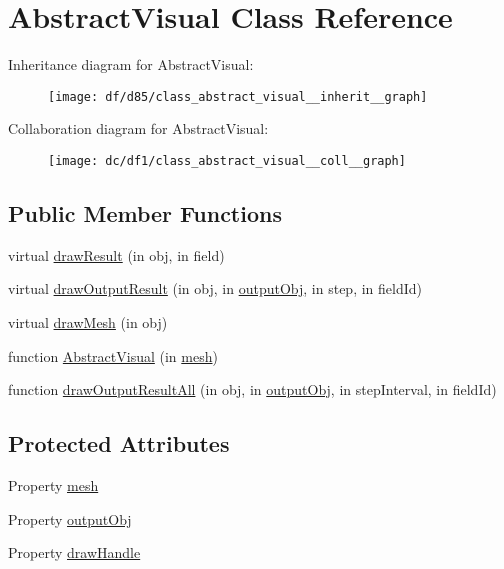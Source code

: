 \hypertarget{class_abstract_visual}{}\section{Abstract\+Visual Class Reference}
\label{class_abstract_visual}


Inheritance diagram for Abstract\+Visual\+:
\nopagebreak
\begin{figure}[H]
\begin{center}
\leavevmode
\texttt{[image: df/d85/class\_abstract\_visual\_\_inherit\_\_graph]}
\end{center}
\end{figure}


Collaboration diagram for Abstract\+Visual\+:
\nopagebreak
\begin{figure}[H]
\begin{center}
\leavevmode
\texttt{[image: dc/df1/class\_abstract\_visual\_\_coll\_\_graph]}
\end{center}
\end{figure}
\subsection*{Public Member Functions}
\begin{DoxyCompactItemize}
\item 
virtual \hyperlink{class_abstract_visual_a35040a07df0303bb579af1810d6efba5}{draw\+Result} (in obj, in field)
\item 
virtual \hyperlink{class_abstract_visual_a70f957e9c842ac364ae51bc5fe04bf81}{draw\+Output\+Result} (in obj, in \hyperlink{class_abstract_visual_a640d3d439c55d1229b740fd6cdf14309}{output\+Obj}, in step, in field\+Id)
\item 
virtual \hyperlink{class_abstract_visual_a4bbff370c33a264137b0d56e1c70da27}{draw\+Mesh} (in obj)
\item 
function \hyperlink{class_abstract_visual_a13019003ba4ef36fcd0a37bb7ac3fbe6}{Abstract\+Visual} (in \hyperlink{class_abstract_visual_a8ab1d2da1797dd6cd72205c673336366}{mesh})
\item 
function \hyperlink{class_abstract_visual_a1835acd8a35f7b6f55621c49921d879a}{draw\+Output\+Result\+All} (in obj, in \hyperlink{class_abstract_visual_a640d3d439c55d1229b740fd6cdf14309}{output\+Obj}, in step\+Interval, in field\+Id)
\end{DoxyCompactItemize}
\subsection*{Protected Attributes}
\begin{DoxyCompactItemize}
\item 
Property \hyperlink{class_abstract_visual_a8ab1d2da1797dd6cd72205c673336366}{mesh}
\item 
Property \hyperlink{class_abstract_visual_a640d3d439c55d1229b740fd6cdf14309}{output\+Obj}
\item 
Property \hyperlink{class_abstract_visual_aa4f580f1e4aa83a1e719dff9287adf1c}{draw\+Handle}
\end{DoxyCompactItemize}


